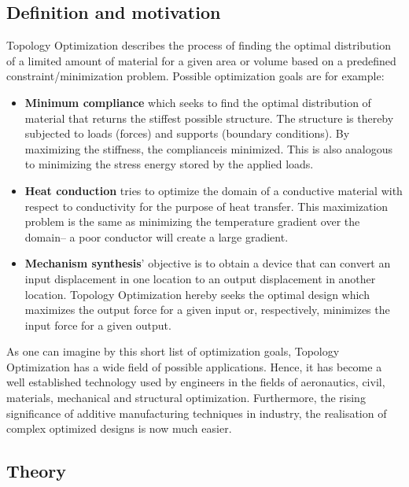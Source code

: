 \label{sec:TopOpt}
\subsection{Definition and motivation}
Topology Optimization describes the process of finding the optimal distribution of a limited amount of material for a given area or volume based on a predefined constraint/minimization problem. Possible optimization goals are for example:
\begin{itemize}
\item \textbf{Minimum compliance} which seeks to find the optimal distribution of material that returns the stiffest possible structure. The structure is thereby subjected to loads (forces) and supports (boundary conditions). By maximizing the stiffness, the complianceis minimized. This is also analogous to minimizing the stress energy stored by the applied loads.
\item \textbf{Heat conduction} tries to optimize the domain of a conductive material with respect to conductivity for the purpose of heat transfer. This maximization problem is the same as minimizing the temperature gradient over the domain-- a poor conductor will create a large gradient.
\item \textbf{Mechanism synthesis}' objective is to obtain a device that can convert an input displacement in one location to an output displacement in another location. Topology Optimization hereby seeks the optimal design which maximizes the output force for a given input or, respectively, minimizes the input force for a given output.
\end{itemize}


As one can imagine by this short list of optimization goals, Topology Optimization has a wide field of possible applications. Hence, it has become a well established technology used by engineers in the fields of aeronautics, civil, materials, mechanical and structural optimization. Furthermore, the rising significance of additive manufacturing techniques in industry, the realisation of complex optimized designs is now much easier. %

\subsection{Theory}
